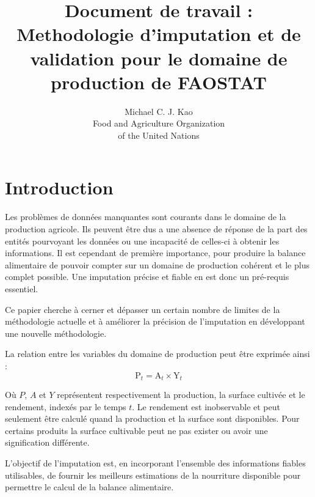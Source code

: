 \documentclass[nojss]{jss}\usepackage{graphicx, color}
\title{\bf Document de travail : Methodologie d'imputation et de
  validation pour le domaine de production de FAOSTAT}
\author{Michael C. J. Kao\\ Food and Agriculture Organization \\ of
  the United Nations}
\begin{document}

\section{Introduction}
Les probl\`{e}mes de donn\'{e}es manquantes sont courants dans le
domaine de la production agricole. Ils peuvent être dus a une absence
de r\'{e}ponse de la part des entit\'{e}s pourvoyant les donn\'{e}es
ou une incapacit\'{e} de celles-ci \`{a} obtenir les informations.  Il
est cependant de premi\`{e}re importance, pour produire la balance
alimentaire de pouvoir compter sur un domaine de production
coh\'{e}rent et le plus complet possible. Une imputation pr\'{e}cise
et fiable en est donc un pr\'{e}-requis essentiel.

Ce papier cherche \`{a} cerner et d\'{e}passer un certain nombre de
limites de la m\'{e}thodologie actuelle et \`{a} am\'{e}liorer la
pr\'{e}cision de l'imputation en d\'{e}veloppant une nouvelle
m\'{e}thodologie.


La relation entre les variables du domaine de production peut être
exprim\'{e}e ainsi :
\begin{equation}
  \label{eq:identity}
  \text{P}_t = \text{A}_t \times \text{Y}_t
\end{equation}


O\`{u} $P$, $A$ et $Y$ repr\'{e}sentent respectivement la production, la
surface cultiv\'{e}e et le rendement, index\'{e}s par le temps $t$. Le
rendement est inobservable et peut seulement \^{e}tre calcul\'{e} quand la
production et la surface sont disponibles. Pour certains produits la
surface cultivable peut ne pas exister ou avoir une signification
diff\'{e}rente.

L'objectif de l'imputation est, en incorporant l'ensemble des
informations fiables utilisables, de fournir les meilleurs estimations
de la nourriture disponible pour permettre le calcul de la balance
alimentaire.
\end{document}
